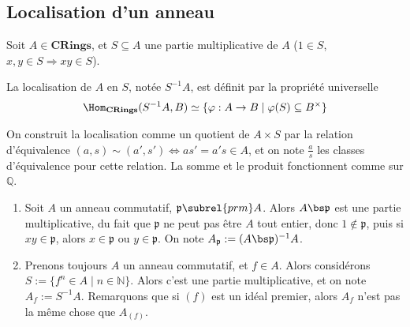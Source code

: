 \appendix
\chapter{}
    \section{Localisation d'un anneau}
        Soit $A \in \mathbf{CRings}$, et $S \subseteq A$ une partie multiplicative de $A$ ($1 \in S$, $x,y \in S \Rightarrow xy \in S$).
        \begin{defi}
            \label{localisation}
            La localisation de $A$ en $S$, notée $S^{-1}A$, est définit par la propriété universelle
            \begin{align*}
                \Hom_{\mathbf{CRings}}(S^{-1}A, B) \simeq \{\varphi : A \to B \mid \varphi(S) \subseteq B^\times\}
            \end{align*}
        \end{defi}
        On construit la localisation comme un quotient de $A \times S$ par la relation d'équivalence $(a,s) \sim (a',s') \iff as' = a's \in A$, et on note $\frac as$ les classes d'équivalence pour cette relation. La somme et le produit fonctionnent comme sur $\mathbb{Q}$.
        \begin{expl}
            \begin{enumerate}
                \item Soit $A$ un anneau commutatif, $\mathfrak{p} \subrel{prm} A$. Alors $A \bs \mathfrak{p}$ est une partie multiplicative, du fait que $\mathfrak{p}$ ne peut pas être $A$ tout entier, donc $1 \notin \mathfrak{p}$, puis si $xy \in \mathfrak{p}$, alors $x \in \mathfrak{p}$ ou $y \in \mathfrak{p}$. On note $A_\mathfrak{p} := (A \bs \mathfrak{p})^{-1}A$.
                \item Prenons toujours $A$ un anneau commutatif, et $f \in A$. Alors considérons $S := \{f^n \in A \mid n \in \mathbb{N}\}$. Alors c'est une partie multiplicative, et on note $A_f := S^{-1}A$. Remarquons que si $(f)$ est un idéal premier, alors $A_f$ n'est pas la même chose que $A_{(f)}$.
            \end{enumerate}
        \end{expl}
        
